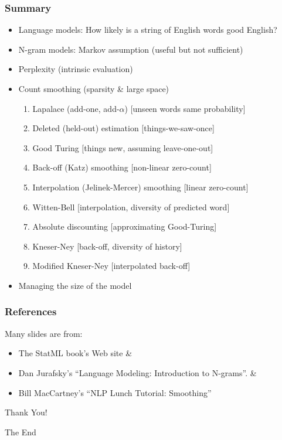 \documentclass{beamer}
\begin{document}
\begin{frame}\frametitle{Summary}

\begin{itemize}
\item  Language models: How \alert{likely} is a string of English words
  good English? 
\item  N-gram models: Markov assumption (useful but \alert{not} sufficient) 
\item  Perplexity (intrinsic evaluation)
\item  Count smoothing (sparsity \& large space)
\begin{enumerate}
\item  Lapalace (add-one, add-$\alpha$) [\alert{unseen words same
  probability}] 
\item  Deleted (held-out) estimation [\alert{things-we-saw-once}]
\item  Good Turing [\alert{things new}, assuming leave-one-out]
\item  Back-off (Katz) smoothing [\alert{non-linear} zero-count]
\item  Interpolation (Jelinek-Mercer) smoothing [\alert{linear} zero-count]
\item  Witten-Bell [interpolation, \alert{diversity} of predicted word]
\item  Absolute discounting [\alert{approximating} Good-Turing]
\item  Kneser-Ney [back-off, \alert{diversity} of history]
\item  Modified Kneser-Ney [\alert{interpolated back-off}]
\end{enumerate}
\item  Managing the size of the model
\end{itemize}

\end{frame}

\begin{frame} \frametitle{References}
Many slides are from:
\begin{itemize}
\item The \alert{StatML} book's Web site \&
\item \alert{Dan Jurafsky}'s
``Language Modeling: Introduction to N-grams''. \&
\item \alert{Bill MacCartney}'s ``NLP Lunch Tutorial: Smoothing''
\end{itemize}
\begin{center}
\Huge\alert {Thank You!}
\end{center}

\end{frame}
\begin{frame}
\Huge{\centerline{The End}}
\end{frame}

\end{document}
